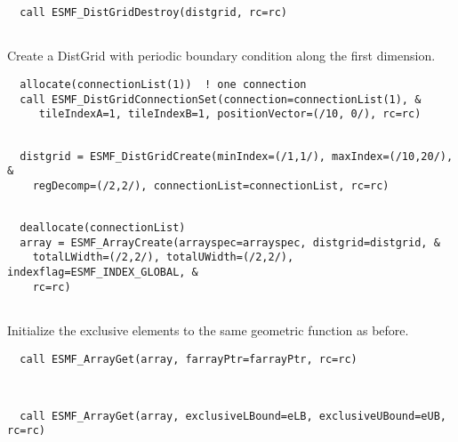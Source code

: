 
 \begin{verbatim}
  call ESMF_DistGridDestroy(distgrid, rc=rc)
 
\end{verbatim}
 

   Create a DistGrid with periodic boundary condition along the first dimension. 

 \begin{verbatim}
  allocate(connectionList(1))  ! one connection
  call ESMF_DistGridConnectionSet(connection=connectionList(1), &
     tileIndexA=1, tileIndexB=1, positionVector=(/10, 0/), rc=rc)
 
\end{verbatim}
 

 \begin{verbatim}
  distgrid = ESMF_DistGridCreate(minIndex=(/1,1/), maxIndex=(/10,20/), &
    regDecomp=(/2,2/), connectionList=connectionList, rc=rc)
 
\end{verbatim}
 

 \begin{verbatim}
  deallocate(connectionList)
  array = ESMF_ArrayCreate(arrayspec=arrayspec, distgrid=distgrid, &
    totalLWidth=(/2,2/), totalUWidth=(/2,2/), indexflag=ESMF_INDEX_GLOBAL, &
    rc=rc)
 
\end{verbatim}
 

   Initialize the exclusive elements to the same geometric function as before. 

 \begin{verbatim}
  call ESMF_ArrayGet(array, farrayPtr=farrayPtr, rc=rc)
 
\end{verbatim}
 

 \begin{verbatim}
  
  call ESMF_ArrayGet(array, exclusiveLBound=eLB, exclusiveUBound=eUB, rc=rc)
 
\end{verbatim}
 
